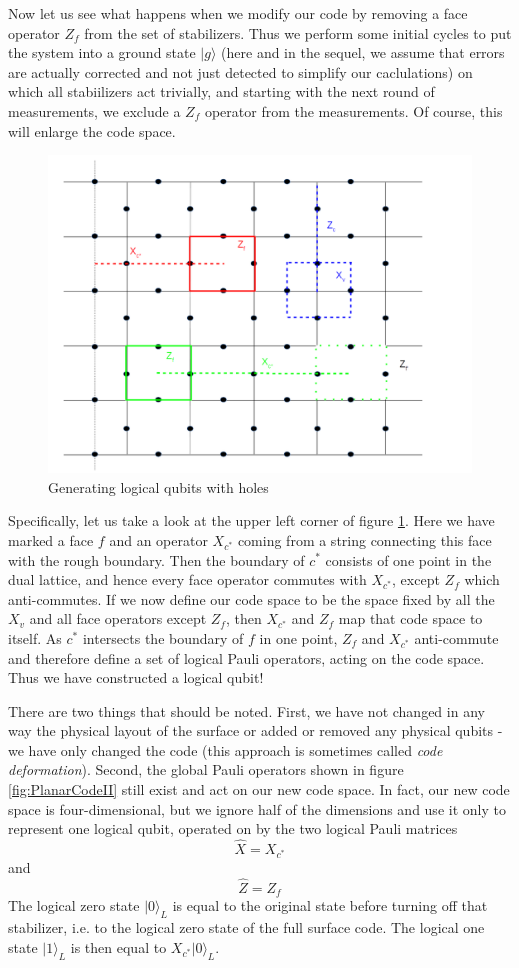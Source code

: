 \documentclass[a4paper, draft]{article}
\theoremstyle{own}
\theoremstyle{remark}
\begin{document}
Now let us see what happens when we modify our code by removing a face operator $Z_f$ from the set of stabilizers. Thus we perform some initial cycles to put the system into a ground state $|g \rangle$ (here and in the sequel, we assume that errors are actually corrected and not just detected to simplify our caclulations) on which all stabiilizers act trivially, and starting with the next round of measurements, we exclude a $Z_f$ operator from the measurements. Of course, this will enlarge the code space. 

\begin{figure}[ht]
\centering
\includegraphics[width=0.7\linewidth]{images/Holes}
\caption[Generating logical qubits with holes]{Generating logical qubits with holes}
\label{fig:Holes}
\end{figure}


Specifically, let us take a look at the upper left corner of figure \ref{fig:Holes}. Here we have marked a face $f$ and an operator $X_{c^*}$ coming from a string connecting this face with the rough boundary. Then the boundary of $c^*$ consists of one point in the dual lattice, and hence every face operator commutes with $X_{c^*}$, except $Z_f$ which anti-commutes. If we now define our code space to be the space fixed by all the $X_v$ and all face operators except $Z_f$, then $X_{c^*}$ and $Z_f$ map that code space to itself. As $c^*$ intersects the boundary of $f$ in one point, $Z_f$ and $X_{c^*}$ anti-commute and therefore define a set of logical Pauli operators, acting on the code space. Thus we have constructed a logical qubit!

There are two things that should be noted. First, we have not changed in any way the physical layout of the surface or added or removed any physical qubits - we have only changed the code (this approach is sometimes called \emph{code deformation}). Second, the global Pauli operators shown in figure \ref{fig:PlanarCodeII} still exist and act on our new code space. In fact, our new code space is four-dimensional, but we ignore half of the dimensions and use it only to represent one logical qubit, operated on by the two logical Pauli matrices
$$
\hat{X} = X_{c^*} 
$$
and
$$
\hat{Z} = Z_f
$$
The logical zero state $|0 \rangle_L$ is equal to the original state before turning off that stabilizer, i.e. to the logical zero state of the full surface code. The logical one state $|1\rangle_L$ is then equal to $X_{c^*} |0 \rangle_L$. 
\end{document}
